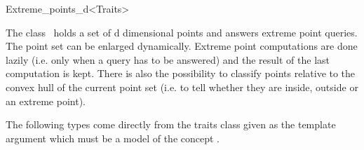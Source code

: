 \ccRefPageBegin


\begin{ccRefClass}{Extreme_points_d<Traits>}  %


\ccDefinition
  
The class \ccRefName\ holds a set of d dimensional points and answers extreme point queries. The point set can be 
enlarged dynamically. Extreme point computations are done lazily (i.e. only when a query has to be answered) and the result of the last computation is kept. There is also the possibility to classify points relative to the convex hull of the current point set (i.e. to tell whether they are inside, outside or an extreme point). 


% 

\ccTypes

The following types come directly from the traits class given as the template argument which must be a model of the concept .


\ccCreation
{}  %


\ccOperations


\end{ccRefClass}
